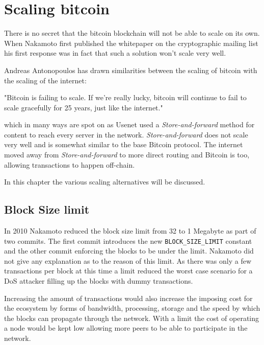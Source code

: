\chapter{Scaling bitcoin}

There is no secret that the bitcoin blockchain will not be able to scale on its own. When Nakamoto first published the whitepaper on the cryptographic mailing list his first response was in fact that such a solution won't scale very well\cite{donald:scale}. 

Andreas Antonopoulos has drawn similarities between the scaling of bitcoin with the scaling of the internet:

\begin{displayquote}
	"Bitcoin is failing to scale. If we’re really lucky, bitcoin will continue to fail to scale gracefully for 25 years, just like the internet."\cite{antonopoulos:the:internet:of:money}
\end{displayquote}

which in many ways are spot on as Usenet used a \textit{Store-and-forward} method for content to reach every server in the network. \textit{Store-and-forward} does not scale very well and is somewhat similar to the base Bitcoin protocol. The internet moved away from \textit{Store-and-forward} to more direct routing and Bitcoin is too, allowing transactions to happen off-chain.

In this chapter the various scaling alternatives will be discussed.

\section{Block Size limit}

In 2010 Nakamoto reduced the block size limit from 32 to 1 Megabyte as part of two commits. The first commit introduces the new \texttt{BLOCK\_SIZE\_LIMIT} constant\cite{nakamoto:commit:1} and the other commit enforcing the blocks to be under the limit\cite{nakamoto:commit:2}. Nakamoto did not give any explanation as to the reason of this limit. As there was only a few transactions per block at this time a limit reduced the worst case scenario for a DoS attacker filling up the blocks with dummy transactions. 

Increasing the amount of transactions would also increase the imposing cost for the ecosystem by forms of bandwidth, processing, storage and the speed by which the blocks can propagate through the network. With a limit the cost of operating a node would be kept low allowing more peers to be able to participate in the network. 

